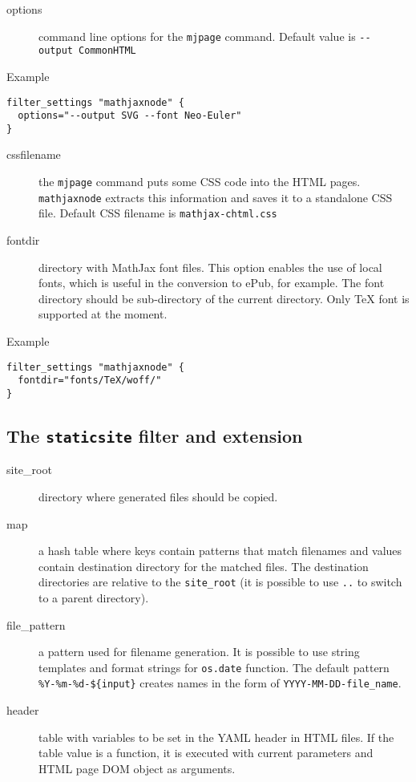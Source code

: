 \begin{description}
\item[options]
command line options for the \texttt{mjpage} command. Default value is
\texttt{-\/-output\ CommonHTML}
\end{description}

Example

\begin{verbatim}
filter_settings "mathjaxnode" {
  options="--output SVG --font Neo-Euler"
}
\end{verbatim}

\begin{description}
\item[cssfilename]
the \texttt{mjpage} command puts some CSS code into the HTML pages.
\texttt{mathjaxnode} extracts this information and saves it to a
standalone CSS file. Default CSS filename is \texttt{mathjax-chtml.css}
\item[fontdir]
directory with MathJax font files. This option enables the use of local
fonts, which is useful in the conversion to ePub, for example. The font
directory should be sub-directory of the current directory. Only TeX
font is supported at the moment.
\end{description}

Example

\begin{verbatim}
filter_settings "mathjaxnode" {
  fontdir="fonts/TeX/woff/" 
}
\end{verbatim}

\hypertarget{the-staticsite-filter-and-extension}{%
\subsection{\texorpdfstring{The \texttt{staticsite} filter and
extension}{The staticsite filter and extension}}\label{the-staticsite-filter-and-extension}}

\begin{description}
\item[site\_root]
directory where generated files should be copied.
\item[map]
a hash table where keys contain patterns that match filenames and values
contain destination directory for the matched files. The destination
directories are relative to the \texttt{site\_root} (it is possible to
use \texttt{..} to switch to a parent directory).
\item[file\_pattern]
a pattern used for filename generation. It is possible to use string
templates and format strings for \texttt{os.date} function. The default
pattern \texttt{\%Y-\%m-\%d-\$\{input\}} creates names in the form of
\texttt{YYYY-MM-DD-file\_name}.
\item[header]
table with variables to be set in the YAML header in HTML files. If the
table value is a function, it is executed with current parameters and
HTML page DOM object as arguments.
\end{description}

